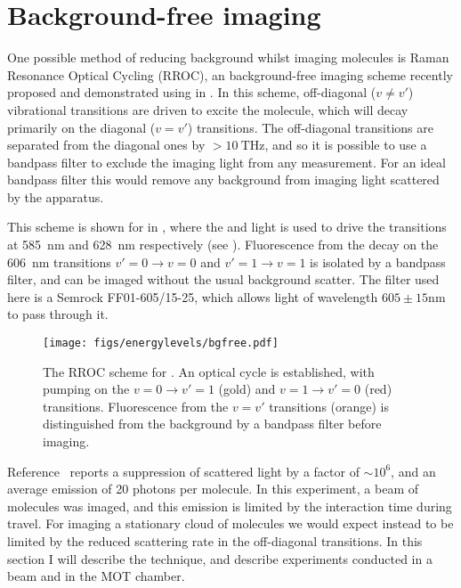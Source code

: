 \section{Background-free imaging}
\label{exper:bgf}

One possible method of reducing background whilst imaging molecules is Raman
Resonance Optical Cycling (RROC), an background-free imaging scheme recently
proposed and demonstrated using \SrF{} in . In this scheme,
off-diagonal ($v\neq v'$) vibrational transitions are driven to excite the
molecule, which will decay primarily on the diagonal ($v=v'$) transitions. The
off-diagonal transitions are separated from the diagonal ones by
$>\SI{10}{\tera\hertz}$, and so it is possible to use a bandpass filter to
exclude the imaging light from any measurement. For an ideal bandpass filter
this would remove any background from imaging light scattered by the apparatus.

This scheme is shown for \CaF{} in , where
the  and  light is used to drive the transitions at
\SI{585}{\nano\meter} and \SI{628}{\nano\meter} respectively (see
). Fluorescence from the decay on the
\SI{606}{\nano\meter} transitions $v'=0\rightarrow v=0$ and $v'=1\rightarrow
v=1$ is isolated by a bandpass filter, and can be imaged without the usual
background scatter. The filter used here is a Semrock FF01-605/15-25, which
allows light of wavelength $605\pm{15}\si{\nano\meter}$ to pass through it.

\begin{figure}
  \centering
  \texttt{[image: figs/energylevels/bgfree.pdf]}
  \caption{
  The RROC scheme for \CaF{}. An optical cycle is established, with pumping on
  the $v=0 \rightarrow v'=1$ (gold) and $v=1 \rightarrow v'=0$ (red) transitions.
  Fluorescence from the $v=v'$ transitions (orange) is distinguished from the
  background by a bandpass filter before imaging.
  }
  \label{exper:fig:bgfreelevels}
\end{figure}

Reference~\cite{Shaw2021} reports a suppression of scattered light by a factor
of $\sim10^6$, and an average emission of 20 photons per molecule. In this
experiment, a beam of molecules was imaged, and this emission is limited by the
interaction time during travel. For imaging a stationary cloud of molecules we
would expect instead to be limited by the reduced scattering rate in the
off-diagonal transitions. In this section I will describe the technique, and
describe experiments conducted in a beam and in the MOT chamber.

